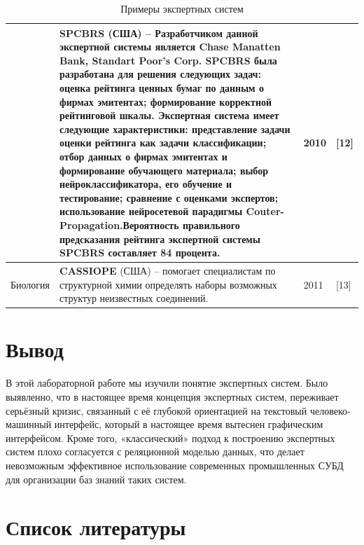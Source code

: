 \documentclass[14pt,a4paper,report]{report}
\begin{document}
\begin{table}[h!]
\begin{tabular}{ | P{2,5cm} | P{12cm} | P{0,7cm} | P{1,3cm} | }
& \textbf{SPCBRS } (США) -- Разработчиком данной экспертной системы является Chase Manatten Bank, Standart Poor's Corp. SPCBRS была разработана для решения следующих задач: оценка рейтинга ценных бумаг по данным о фирмах эмитентах; формирование корректной рейтинговой шкалы. Экспертная система имеет следующие характеристики: представление задачи оценки рейтинга как задачи классификации; отбор данных о фирмах эмитентах и формирование обучающего материала; выбор нейроклассификатора, его обучение и тестирование; сравнение с оценками экспертов; использование нейросетевой парадигмы Couter-Propagation.Вероятность правильного предсказания рейтинга экспертной системы SPCBRS составляет 84 процента. & 2010 & [12] \\ \hline



Биология 


& \textbf{CASSIOPE} (США) -- помогает специалистам по структурной химии определять наборы возможных структур неизвестных соединений. & 2011 & [13] \\ \hline


\end{tabular}
\egroup
\caption{Примеры экспертных систем}
\label{table:2}
\end{table}

\section{Вывод}

В этой лабораторной работе мы изучили понятие экспертных систем. Было выявленно, что в настоящее время концепция экспертных систем, переживает серьёзный кризис, связанный с её глубокой ориентацией на текстовый человеко-машинный интерфейс, который в настоящее время вытеснен графическим интерфейсом. Кроме того, «классический» подход к построению экспертных систем плохо согласуется с реляционной моделью данных, что делает невозможным эффективное использование современных промышленных СУБД для организации баз знаний таких систем.

\clearpage

\section{Список литературы}
\end{document}
